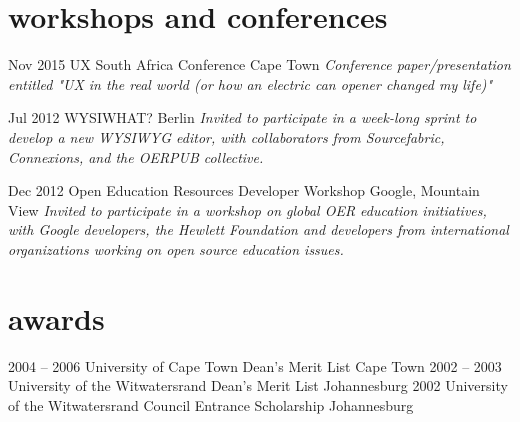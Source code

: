 \documentclass[]{friggeri-cv} %
\begin{document}

\section{workshops and conferences}

\begin{entrylist}
\entry
{Nov 2015}
{UX South Africa Conference}
{Cape Town}
{\emph{Conference paper/presentation entitled "UX in the real world (or how an electric can opener changed my life)"}}

\entry
{Jul 2012}
{WYSIWHAT?}
{Berlin}
{\emph{Invited to participate in a week-long sprint to develop a new WYSIWYG editor, with collaborators from Sourcefabric, Connexions, and the OERPUB collective.}}

\entry
{Dec 2012}
{Open Education Resources Developer Workshop}
{Google, Mountain View}
{\emph{Invited to participate in a workshop on global OER education initiatives, with Google developers, the Hewlett Foundation and developers from international organizations working on open source education issues.}}

\end{entrylist}


\section{awards}

\begin{entrylist}
\entry
{2004 -- 2006}
{University of Cape Town Dean's Merit List}
{Cape Town}
{}
\entry
{2002 -- 2003}
{University of the Witwatersrand Dean's Merit List}
{Johannesburg}
{}
\entry
{2002}
{University of the Witwatersrand Council Entrance Scholarship}
{Johannesburg}
{}
\end{entrylist}
\end{document}
